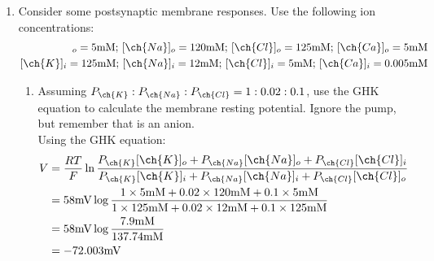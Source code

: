 \documentclass[11pt]{article}
\begin{document}
\begin{enumerate}[label=\arabic*.]
\newpage
\item
Consider some postsynaptic membrane responses. Use the following ion concentrations:
\begin{align*}
[\ch{K}]_o = 5 \text{mM; } [\ch{Na}]_o = 120 \text{mM; } [\ch{Cl}]_o = 125 \text{mM; } [\ch{Ca}]_o = 5 \text{mM} \\
[\ch{K}]_i = 125 \text{mM; } [\ch{Na}]_i = 12 \text{mM; } [\ch{Cl}]_i = 5 \text{mM; } [\ch{Ca}]_i = 0.005 \text{mM}
\end{align*}
\begin{enumerate}[label=(\alph*)]
\item
Assuming $P_{\ch{K}} : P_{\ch{Na}} : P_{\ch{Cl}} = 1 : 0.02 : 0.1$, use the GHK equation to calculate the membrane resting potential. Ignore the pump, but remember that  is an anion.
\vspace*{1\baselineskip}
\\
Using the GHK equation:
\begin{align*}
V &= \frac{RT} {F} \ln{\frac{P_{\ch{K}} [\ch{K}]_o + P_{\ch{Na}} [\ch{Na}]_o + P_{\ch{Cl}} [\ch{Cl}]_i} {P_{\ch{K}} [\ch{K}]_i + P_{\ch{Na}} [\ch{Na}]_i + P_{\ch{Cl}} [\ch{Cl}]_o}} \\
 &= 58 \text{mV} \log{\frac{1 \times 5 \text{mM} + 0.02 \times 120 \text{mM} + 0.1 \times 5 \text{mM}} {1 \times 125 \text{mM} + 0.02 \times 12 \text{mM} + 0.1 \times 125 \text{mM}}} \\
 &= 58 \text{mV} \log{\frac{7.9 \text{mM}} {137.74 \text{mM}}} \\
 &= -72.003 \text{mV}
\end{align*}




\end{enumerate}
\end{enumerate}
\end{document}
